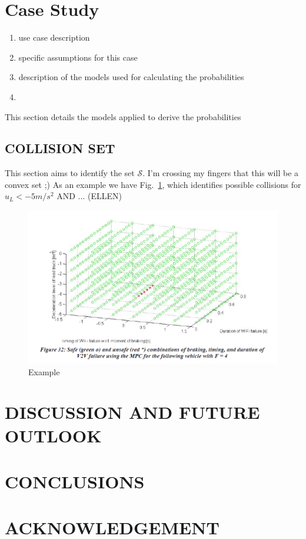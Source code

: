 \documentclass[letterpaper, 10 pt, conference]{ieeeconf}  %
\begin{document}
\section{Case Study} %

\begin{enumerate}
	\item use case description
	\item specific assumptions for this case
	\item description of the models used for calculating the probabilities 
	\item 
\end{enumerate}


This section details the models applied to derive the probabilities
\subsection{COLLISION SET}
This section aims to identify the set $\mathcal{S}$. I'm crossing my fingers that this will be a convex set ;)
As an example we have Fig.~\ref{fig:example}, which identifies possible collisions for $u_L<-5 m/s^2$ AND ...
(ELLEN)
\begin{figure}
  \centering
  \includegraphics[width=1\columnwidth]{example.png}
  \caption{Example }\label{fig:example}
\end{figure}


\section{DISCUSSION AND FUTURE OUTLOOK} %

\section{CONCLUSIONS}\label{sec:conc}




\section*{ACKNOWLEDGEMENT}



%
%
\end{document}
